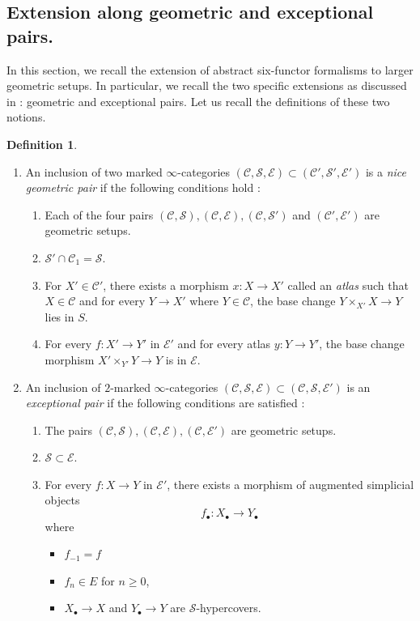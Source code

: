 \documentclass[14pt]{article}
\theoremstyle{definition}
\newtheorem{definition}[theorem]{Definition}
\newcommand{\E}{\mathcal{E}}
\renewcommand{\S}{\mathcal{S}}
\newcommand{\C}{\mathcal{C}}
\newcommand{\Ca}{\mathcal{C}}
\newcommand{\bb}{\bullet}
\numberwithin{subsection}{section}
\begin{document}
\subsection{Extension along geometric and exceptional pairs.}

In this section, we recall the extension of abstract six-functor formalisms to larger geometric setups. In particular, we recall the two specific extensions as discussed in \cite{chowdhury2025sixfunctorformalismsiiiconstruction}: geometric and exceptional pairs. Let us recall the definitions of these two notions.

\begin{definition}\label{Definition:Nice geometric and exceptional pairs.}
\begin{enumerate}
    \item An inclusion of two marked $\infty$-categories $(\Ca,\S,\E) \subset (\Ca',\S',\E')$ is a \textit{nice geometric pair} if the following conditions hold :
    \begin{enumerate}
        \item Each of the four pairs $(\Ca,\S),(\Ca,\E),(\Ca,\S')$ and $(\Ca',\E')$ are geometric setups.
        \item $\S' \cap \Ca_1 =\S$.
        \item For  $X' \in \Ca'$, there exists a morphism $x : X \to X'$ called an \textit{atlas} such that $X \in \Ca$ and for every $Y \to X'$ where $Y \in \Ca$, the base change $Y \times_{X'} X \to Y$ lies in $S$.
        \item For every $f : X' \to Y'$ in $\E'$ and for every atlas $y : Y \to Y'$, the base change morphism $X' \times_{Y'}Y \to Y$ is in $\E.$
    \end{enumerate}
    \item An inclusion of $2$-marked $\infty$-categories $(\Ca,\S,\E) \subset (\Ca,\S,\E')$ is an \textit{exceptional pair} if the following conditions are satisfied :
    \begin{enumerate}
        \item The pairs $(\C,\S),(\Ca,\E),(\Ca,\E')$ are geometric setups.
        \item $\S \subset \E$.
        \item For every $f: X \to Y$ in $\E'$, there exists a morphism of augmented simplicial objects 
    \begin{equation*}
        f_{\bb} : X_{\bb} \to Y_{\bb}
        \end{equation*}
        where 
        \begin{itemize}
            \item $f_{-1}=f$
            \item $f_n \in E$ for $n \ge 0$,
            \item $X_{\bb} \to X$ and $Y_{\bb} \to Y$ are $\S$-hypercovers.
        \end{itemize}
        
    \end{enumerate}
    \end{enumerate}
\end{definition}
\end{document}
